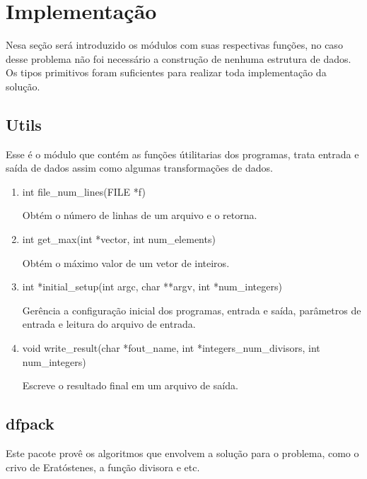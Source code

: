 \documentclass{article}
\begin{document}
\section{Implementação}

Nesa seção será introduzido os módulos com suas respectivas funções, no caso desse problema não foi necessário a construção de nenhuma estrutura de dados. Os tipos primitivos foram suficientes para realizar toda implementação da solução.
\subsection{Utils}

Esse é o módulo que contém as funções útilitarias dos programas, trata entrada e saída de dados assim como algumas transformações de dados.

\begin{enumerate}

    \item int file\_num\_lines(FILE *f)
	
	Obtém o número de linhas de um arquivo e o retorna.

    \item int get\_max(int *vector, int num\_elements)
	
	Obtém o máximo valor de um vetor de inteiros.

    \item int *initial\_setup(int argc, char **argv, int *num\_integers)
	
	Gerência a configuração inicial dos programas, entrada e saída, parâmetros de entrada e leitura do arquivo de entrada.

    \item void write\_result(char *fout\_name, int *integers\_num\_divisors, int num\_integers)
	
	Escreve o resultado final em um arquivo de saída.

    \end{enumerate}

\subsection{dfpack}

Este pacote provê os algoritmos que envolvem a solução para o problema, como o crivo de Eratóstenes, a função divisora e etc.
\end{document}

